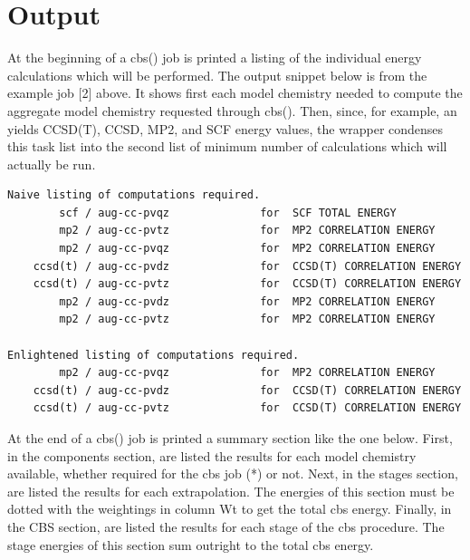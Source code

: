 \documentclass[letterpaper,10pt,english]{sphinxmanual}
\begin{document}
\section{Output}
\label{index:id1}
At the beginning of a cbs() job is printed a listing of the individual
energy calculations which will be performed. The output snippet below is
from the example job {[}2{]} above. It shows first each model chemistry needed
to compute the aggregate model chemistry requested through cbs(). Then,
since, for example, an  yields CCSD(T), CCSD, MP2,
and SCF energy values, the wrapper condenses this task list into the second
list of minimum number of calculations which will actually be run.

\begin{Verbatim}[commandchars=\\\{\}]
Naive listing of computations required.
        scf / aug-cc-pvqz              for  SCF TOTAL ENERGY
        mp2 / aug-cc-pvtz              for  MP2 CORRELATION ENERGY
        mp2 / aug-cc-pvqz              for  MP2 CORRELATION ENERGY
    ccsd(t) / aug-cc-pvdz              for  CCSD(T) CORRELATION ENERGY
    ccsd(t) / aug-cc-pvtz              for  CCSD(T) CORRELATION ENERGY
        mp2 / aug-cc-pvdz              for  MP2 CORRELATION ENERGY
        mp2 / aug-cc-pvtz              for  MP2 CORRELATION ENERGY

Enlightened listing of computations required.
        mp2 / aug-cc-pvqz              for  MP2 CORRELATION ENERGY
    ccsd(t) / aug-cc-pvdz              for  CCSD(T) CORRELATION ENERGY
    ccsd(t) / aug-cc-pvtz              for  CCSD(T) CORRELATION ENERGY
\end{Verbatim}

At the end of a cbs() job is printed a summary section like the one below. First,
in the components section, are listed the results for each model chemistry available, whether
required for the cbs job (*) or not. Next, in the stages section, are listed the results for
each extrapolation. The energies of this section must be dotted with the weightings in column Wt
to get the total cbs energy. Finally, in the CBS section, are listed the results for each stage
of the cbs procedure. The stage energies of this section sum outright to the total cbs energy.
\end{document}
